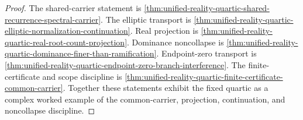 \begin{proof}
The shared-carrier statement is
\autoref{thm:unified-reality-quartic-shared-recurrence-spectral-carrier}.
The elliptic transport is
\autoref{thm:unified-reality-quartic-elliptic-normalization-continuation}.
Real projection is
\autoref{thm:unified-reality-quartic-real-root-count-projection}.
Dominance noncollapse is
\autoref{thm:unified-reality-quartic-dominance-finer-than-ramification}.
Endpoint-zero transport is
\autoref{thm:unified-reality-quartic-endpoint-zero-branch-interference}.
The finite-certificate and scope discipline is
\autoref{thm:unified-reality-quartic-finite-certificate-common-carrier}.
Together these statements exhibit the fixed quartic as a complex worked
example of the common-carrier, projection, continuation, and
noncollapse discipline.
\end{proof}

